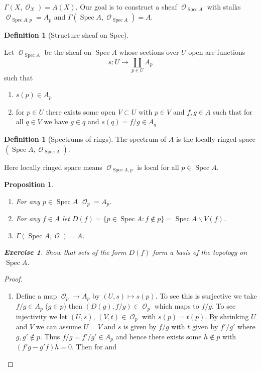 \documentclass[10pt,]{book}
\theoremstyle{plain}
\newtheorem{proposition}[theorem]{Proposition}
\theoremstyle{definition}
\newtheorem{definition}[theorem]{Definition}
\newtheorem{exercise}[theorem]{Exercise}
\numberwithin{equation}{section}
\DeclareMathOperator{\sO}{\mathcal{O}}
\DeclareMathOperator{\Spec}{Spec}
\begin{document}
          \(\Gamma(X,\sO_X) = A(X)\).
          Our goal is to construct a sheaf \(\sO_{\Spec A}\) with stalks \(\sO_{\Spec A, p} = A_p\) and \(\Gamma(\Spec A, \sO_{\Spec A}) = A\).
\begin{definition}[Structure sheaf on Spec]\label{definition-4}

            Let \(\sO_{\Spec A}\) be the sheaf on \(\Spec A\) whose sections over \(U\) open are functions \[s\colon U \to \coprod_{p\in U} A_p\]
            such that
            \begin{enumerate}
\item{}\(s(p)\in A_p\)\item{}for \(p\in U\) there exists some open \(V \subset U\) with \(p\in V\) and \(f,g\in A\) such that for all \(q\in V\) we have \(g\in q\) and \(s(q) = f/g \in A_q\)\end{enumerate}
\end{definition}
\begin{definition}[Spectrums of rings]\label{definition-5}
The spectrum of \(A\) is the locally ringed space \((\Spec A,\sO_{\Spec A})\).\end{definition}
\par
Here locally ringed space means \(\sO_{\Spec A,p}\) is local for all \(p\in \Spec A\).%
\begin{proposition}\label{proposition-1}
\begin{enumerate}
\item{}For any \(p\in \Spec A\) \(\sO_p = A_p\).\item{}For any \(f\in A\) let \(D(f) = \{p\in \Spec A : f\notin p\} = \Spec A \smallsetminus V(f)\).\item{}\(\Gamma(\Spec A,\sO) = A\).\end{enumerate}
\begin{exercise}\label{exercise-3}
Show that sets of the form \(D(f)\) form a basis of the topology on \(\Spec A\).\end{exercise}
\end{proposition}
\begin{proof}
\begin{enumerate}
\item{}Define a map \(\sO_p\to A_p\) by \((U,s)\mapsto s(p)\).
                To see this is surjective we take \(f/g\in A_p\) (\(g\in p\)) then \((D(g),f/g) \in \sO_p\) which maps to \(f/g\).
                To see injectivity we let \((U,s),\,(V,t) \in \sO_p\) with \(s(p) = t(p)\).
                By shrinking \(U\) and \(V\) we can assume \(U = V\) and \(s\) is given by \(f/g\) with \(t\) given by \(f'/g'\) where \(g,g'\notin p\).
                Thus \(f/g = f'/g' \in A_p\) and hence there exists some \(h\notin p\) with \((f'g - g'f)h = 0\).
                Then for and
                
              \end{enumerate}
\end{proof}
\end{document}
